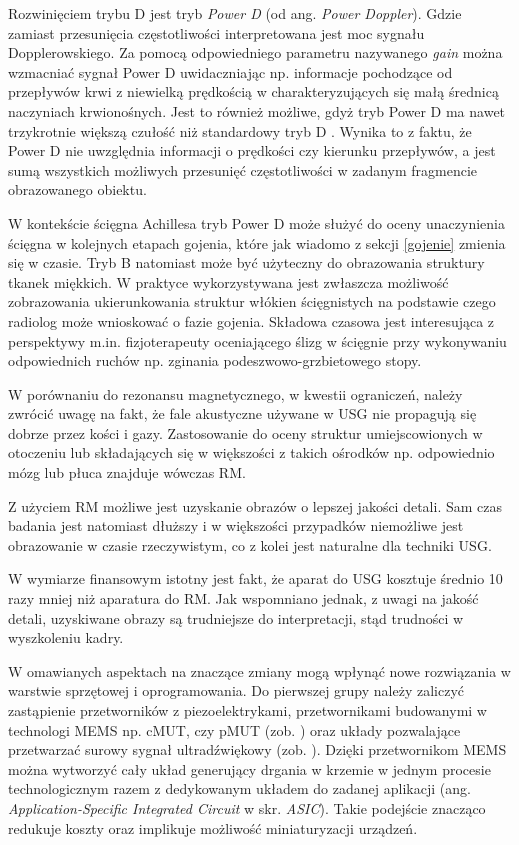 Rozwinięciem trybu D jest tryb \textit{Power D} (od ang. \textit{Power Doppler}). Gdzie zamiast przesunięcia częstotliwości interpretowana jest moc sygnału Dopplerowskiego. Za pomocą odpowiedniego parametru nazywanego \textit{gain} można wzmacniać sygnał Power D uwidaczniając np. informacje pochodzące od przepływów krwi z niewielką prędkością w charakteryzujących się małą średnicą naczyniach krwionośnych. Jest to również możliwe, gdyż tryb Power D ma nawet trzykrotnie większą czułość niż standardowy tryb D \cite{Babcock1996}. Wynika to z faktu, że Power D nie uwzględnia informacji o prędkości czy kierunku przepływów, a jest sumą wszystkich możliwych przesunięć częstotliwości w zadanym fragmencie obrazowanego obiektu.

W kontekście ścięgna Achillesa tryb Power D może służyć do oceny unaczynienia ścięgna w kolejnych etapach gojenia, które jak wiadomo z sekcji \ref{gojenie} zmienia się w czasie. Tryb B natomiast może być użyteczny do obrazowania struktury tkanek miękkich. W praktyce wykorzystywana jest zwłaszcza możliwość zobrazowania ukierunkowania struktur włókien ścięgnistych na podstawie czego radiolog może wnioskować o fazie gojenia. Składowa czasowa jest interesująca z perspektywy m.in. fizjoterapeuty oceniającego ślizg w ścięgnie przy wykonywaniu odpowiednich ruchów np. zginania podeszwowo-grzbietowego stopy. 

W porównaniu do rezonansu magnetycznego, w kwestii ograniczeń, należy zwrócić uwagę na fakt, że fale akustyczne używane w USG nie propagują się dobrze przez kości i gazy. Zastosowanie do oceny struktur umiejscowionych w otoczeniu lub składających się w większości z takich ośrodków np. odpowiednio mózg lub płuca znajduje wówczas RM. 

Z użyciem RM możliwe jest uzyskanie obrazów o lepszej jakości detali. Sam czas badania jest natomiast dłuższy i w większości przypadków niemożliwe jest obrazowanie w czasie rzeczywistym, co z kolei jest naturalne dla techniki USG.

W wymiarze finansowym istotny jest fakt, że aparat do USG kosztuje średnio 10 razy mniej niż aparatura do RM. Jak wspomniano jednak, z uwagi na jakość detali, uzyskiwane obrazy są trudniejsze do interpretacji, stąd trudności w  wyszkoleniu kadry. 

W omawianych aspektach na znaczące zmiany mogą wpłynąć nowe rozwiązania w warstwie sprzętowej i oprogramowania. Do pierwszej grupy należy zaliczyć zastąpienie przetworników z piezoelektrykami, przetwornikami budowanymi w technologi MEMS np. cMUT, czy pMUT (zob. \cite{Butterfly2018}) oraz układy pozwalające przetwarzać surowy sygnał ultradźwiękowy (zob. \cite{US4US}). Dzięki przetwornikom MEMS można wytworzyć cały układ generujący drgania w krzemie w jednym procesie technologicznym razem z dedykowanym układem do zadanej aplikacji (ang. \textit{Application-Specific Integrated Circuit} w skr. \textit{ASIC}). Takie podejście znacząco redukuje koszty oraz implikuje możliwość miniaturyzacji urządzeń.

